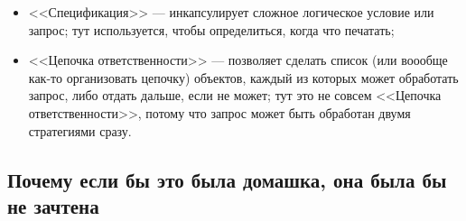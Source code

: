 \documentclass[a5paper]{article}
\begin{document}
\begin{itemize}
\begin{itemize}
        \item <<Спецификация>> --- инкапсулирует сложное логическое условие или запрос; тут используется, чтобы определиться, когда что печатать;
        \item <<Цепочка ответственности>> --- позволяет сделать список (или воообще как-то организовать цепочку) объектов, каждый из которых может обработать запрос, либо отдать дальше, если не может; тут это не совсем <<Цепочка ответственности>>, потому что запрос может быть обработан двумя стратегиями сразу.
    \end{itemize}
\end{itemize}

\subsection{Почему если бы это была домашка, она была бы не зачтена}
\end{document}
